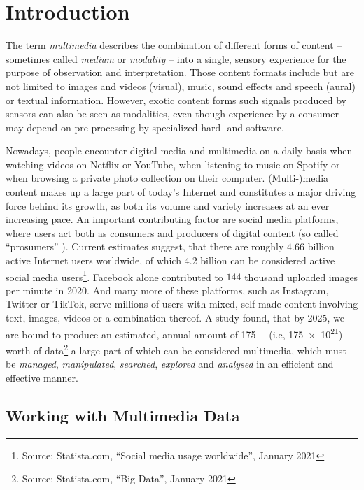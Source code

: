 \chapter{Introduction}
\label{chapter:introduction}

The term \emph{multimedia} describes the combination of different forms of content -- sometimes called \emph{medium} or \emph{modality} -- into a single, sensory experience for the purpose of observation and interpretation. Those content formats include but are not limited to images and videos (visual), music, sound effects and speech (aural) or textual information. However, exotic content forms such signals produced by sensors can also be seen as modalities, even though experience by a consumer may depend on pre-processing by specialized hard- and software.

Nowadays, people encounter digital media and multimedia on a daily basis when watching videos on Netflix or YouTube, when listening to music on Spotify or when browsing a private photo collection on their computer. (Multi-)media content makes up a large part of today's Internet and constitutes a major driving force behind its growth, as both its volume and variety increases at an ever increasing pace. An important contributing factor are social media platforms, where users act both as consumers and producers of digital content (so called ``prosumers'' \cite{Ritzer:2010Production,Ritzer2012:Coming}). Current estimates suggest, that there are roughly $4.66$ billion active Internet users worldwide, of which $4.2$ billion can be considered active social media users\footnote{Source: Statista.com, ``Social media usage worldwide'', January 2021}. Facebook alone contributed to $144$ thousand uploaded images per minute in 2020. And many more of these  platforms, such as Instagram, Twitter or TikTok, serve millions of users with mixed, self-made content involving text, images, videos or a combination thereof. A study found, that by 2025, we are bound to produce an estimated, annual amount of \SI{175}{\zetta\byte} (i.e, \SI{175e21}{\byte}) worth of data\footnote{Source: Statista.com, ``Big Data'', January 2021} a large part of which can be considered multimedia, which must be \emph{managed}, \emph{manipulated}, \emph{searched}, \emph{explored} and \emph{analysed} in an efficient and effective manner.

\section{Working with Multimedia Data}


